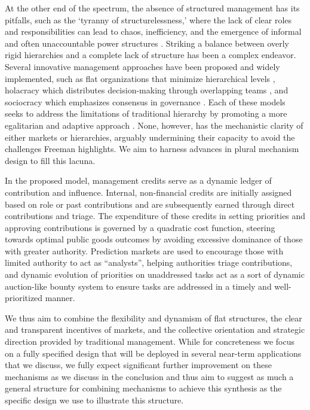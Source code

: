 \documentclass{article}
\begin{document}
At the other end of the spectrum, the absence of structured management has its pitfalls, such as the `tyranny of structurelessness,' where the lack of clear roles and responsibilities can lead to chaos, inefficiency, and the emergence of informal and often unaccountable power structures \cite{friedman2007social}. Striking a balance between overly rigid hierarchies and a complete lack of structure has been a complex endeavor. Several innovative management approaches have been proposed and widely implemented, such as flat organizations that minimize hierarchical levels \cite{laloux2014reinventing}, holacracy which distributes decision-making through overlapping teams \cite{robertson2015holacracy}, and sociocracy which emphasizes consensus in governance \cite{buck2012creative}. Each of these models seeks to address the limitations of traditional hierarchy by promoting a more egalitarian and adaptive approach \cite{rothschild1986cooperative}. None, however, has the mechanistic clarity of either markets or hierarchies, arguably undermining their capacity to avoid the challenges Freeman highlights. We aim to harness advances in plural mechanism design to fill this lacuna.

In the proposed model, management credits serve as a dynamic ledger of contribution and influence. Internal, non-financial credits are initially assigned based on role or past contributions and are subsequently earned through direct contributions and triage. The expenditure of these credits in setting priorities and approving contributions is governed by a quadratic cost function, steering towards optimal public goods outcomes by avoiding excessive dominance of those with greater authority. Prediction markets are used to encourage those with limited authority to act as ``analysts'', helping authorities triage contributions, and dynamic evolution of priorities on unaddressed tasks act as a sort of dynamic auction-like bounty system to ensure tasks are addressed in a timely and well-prioritized manner.

We thus aim to combine the flexibility and dynamism of flat structures, the clear and transparent incentives of markets, and the collective orientation and strategic direction provided by traditional management. While for concreteness we focus on a fully specified design that will be deployed in several near-term applications that we discuss, we fully expect significant further improvement on these mechanisms as we discuss in the conclusion and thus aim to suggest as much a general structure for combining mechanisms to achieve this synthesis as the specific design we use to illustrate this structure.
\end{document}
